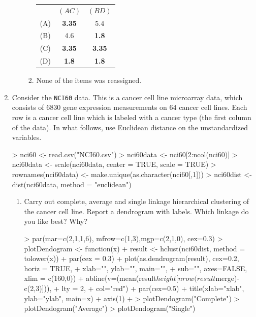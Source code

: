 \documentclass[12pt,a4paper]{paper}
\begin{document}
\begin{enumerate}
\begin{enumerate}
\begin{enumerate}
\begin{tabular}{ccc}
&$(AC)$&$(BD)$\\
(A)&\textbf{3.35}&5.4\\
(B)&4.6&\textbf{1.8}\\
(C)&\textbf{3.35}&\textbf{3.35}\\
(D)&\textbf{1.8}&\textbf{1.8}\\
\end{tabular}
\item None of the items was reassigned.
\end{enumerate}
\end{enumerate}
\item Consider the \texttt{NCI60} data. This is a cancer cell line microarray data, which consists of 6830 gene expression measurements on 64 cancer cell lines. Each row is a cancer cell line which is labeled with a cancer type (the first column of the data). In what follows, use Euclidean distance on the unstandardized variables.
\begin{Schunk}
\begin{Sinput}
> nci60 <- read.csv("NCI60.csv")
> nci60data <- nci60[2:ncol(nci60)]
> nci60data <- scale(nci60data, center = TRUE, scale = TRUE)
> rownames(nci60data) <- make.unique(as.character(nci60[,1]))
> nci60dist <- dist(nci60data, method = "euclidean")
\end{Sinput}
\end{Schunk}
\begin{enumerate}
\item Carry out complete, average and single linkage hierarchical clustering of the cancer cell line. Report a dendrogram with labels. Which linkage do you like best? Why?
\begin{Schunk}
\begin{Sinput}
> par(mar=c(2,1,1,6), mfrow=c(1,3),mgp=c(2,1,0), cex=0.3)
> plotDendogram <- function(x){
+   result <- hclust(nci60dist, method = tolower(x))
+   par(cex = 0.3)
+   plot(as.dendrogram(result), cex=0.2, horiz = TRUE, 
+        xlab="", ylab="", main="", 
+        sub="", axes=FALSE, xlim = c(160,0))
+   abline(v=(mean(result$height[nrow(result$merge)-c(2,3)])), 
+          lty = 2, 
+          col="red")
+   par(cex=0.5)
+   title(xlab="xlab", ylab="ylab", main=x)
+   axis(1)
+ }
> plotDendogram("Complete")
> plotDendogram("Average")
> plotDendogram("Single")
\end{Sinput}
\end{Schunk}

\end{enumerate}
\end{enumerate}
\end{document}

